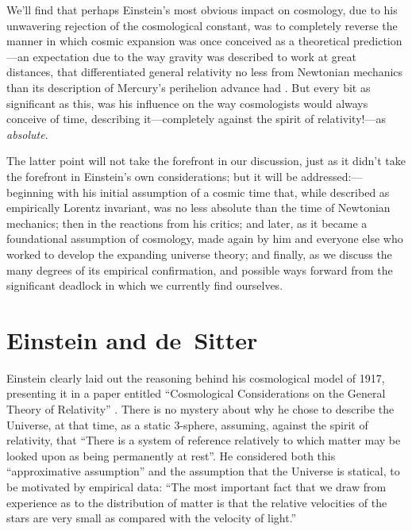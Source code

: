 \documentclass[12 pt]{article}
\begin{document}
We'll find that perhaps Einstein's most obvious impact on cosmology, due to his unwavering rejection of the cosmological constant, was to completely reverse the manner in which cosmic expansion was once conceived as a theoretical prediction---an expectation due to the way gravity was described to work at great distances, that differentiated general relativity no less from Newtonian mechanics than its description of Mercury's perihelion advance had \citep[pp.~24-25]{Eddington1933}. But every bit as significant as this, was his influence on the way cosmologists would always conceive of time, describing it---completely against the spirit of relativity!---as \textit{absolute}.

The latter point will not take the forefront in our discussion, just as it didn't take the forefront in Einstein's own considerations; but it will be addressed:---beginning with his initial assumption of a cosmic time that, while described as empirically Lorentz invariant, was no less absolute than the time of Newtonian mechanics; then in the reactions from his critics; and later, as it became a foundational assumption of cosmology, made again by him and everyone else who worked to develop the expanding universe theory; and finally, as we discuss the many degrees of its empirical confirmation, and possible ways forward from the significant deadlock in which we currently find ourselves. 
\section{Einstein and de~Sitter}
\label{sec:2}
Einstein clearly laid out the reasoning behind his cosmological model of 1917, presenting it in a paper entitled ``Cosmological Considerations on the General Theory of Relativity'' \citep{Einstein1917}. There is no mystery about why he chose to describe the Universe, at that time, as a static 3-sphere, assuming, against the spirit of relativity, that ``There is a system of reference relatively to which matter may be looked upon as being permanently at rest''. He considered both this ``approximative assumption'' and the assumption that the Universe is statical, to be motivated by empirical data: ``The most important fact that we draw from experience as to the distribution of matter is that the relative velocities of the stars are very small as compared with the velocity of light.''
\end{document}

